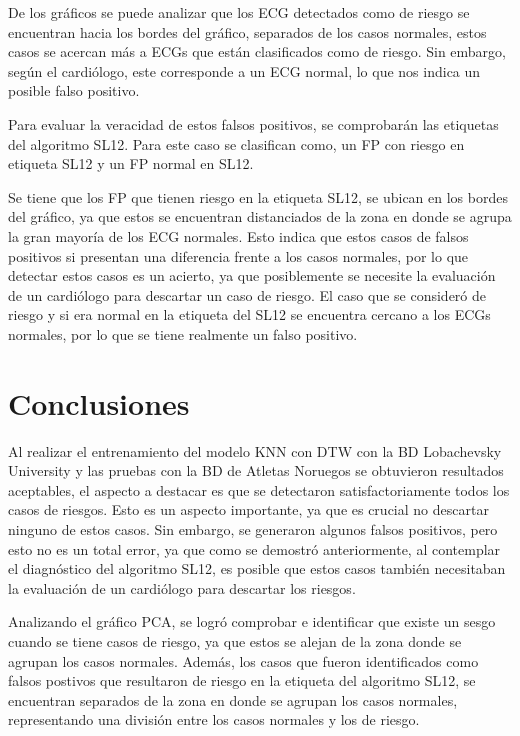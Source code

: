 \documentclass[conference]{IEEEtran}
\begin{document}
De los gráficos se puede analizar que los ECG detectados como de riesgo se encuentran 
hacia los bordes del gráfico, separados de los casos normales, estos casos se acercan 
más a ECGs que están clasificados como de riesgo. Sin embargo, según el cardiólogo, 
este corresponde a un ECG normal, lo que nos indica un posible falso positivo.

Para evaluar la veracidad de estos falsos positivos, se comprobarán las etiquetas del
 algoritmo SL12. Para este caso se clasifican como, un FP con riesgo en etiqueta SL12 y un FP normal en SL12. 

Se tiene que los FP que tienen riesgo en la etiqueta SL12, se ubican en los bordes del 
gráfico, ya que estos se encuentran distanciados de la zona en donde se agrupa la gran 
mayoría de los ECG normales. Esto indica que estos casos de falsos positivos si presentan
 una diferencia frente a los casos normales, por lo que detectar estos casos es un acierto, 
 ya que posiblemente se necesite la evaluación de un cardiólogo para descartar un caso de riesgo.
El caso que se consideró de riesgo y si era normal en la etiqueta del SL12 se encuentra 
cercano a los ECGs normales, por lo que se tiene realmente un falso positivo.





\section{Conclusiones}

Al realizar el entrenamiento del modelo KNN con DTW con la BD Lobachevsky University y 
las pruebas con la BD de Atletas Noruegos se obtuvieron resultados aceptables, el aspecto a 
destacar es que se detectaron satisfactoriamente todos los casos de riesgos. Esto es un aspecto 
importante, ya que es crucial no descartar ninguno de estos casos. Sin embargo, se generaron 
algunos falsos positivos, pero esto no es un total error, ya que como se demostró anteriormente, 
al contemplar el diagnóstico del algoritmo SL12, es posible que estos casos también necesitaban 
la evaluación de un cardiólogo para descartar los riesgos. 

Analizando el gráfico PCA, se logró comprobar e identificar que existe un sesgo cuando se tiene 
casos de riesgo, ya que estos se alejan de la zona donde se agrupan los casos normales. 
Además, los casos que fueron identificados como falsos postivos que resultaron de riesgo en 
la etiqueta del algoritmo SL12, se encuentran separados de la zona en donde se agrupan los 
casos normales, representando una división entre los casos normales y los de riesgo. 
\end{document}
